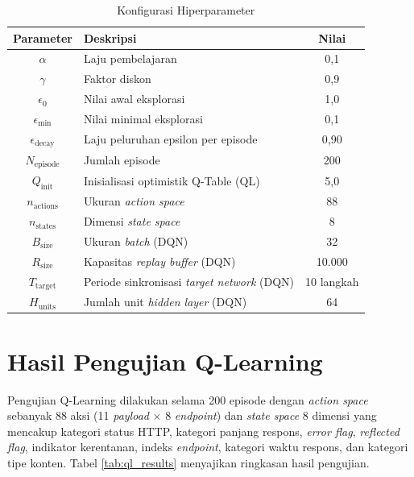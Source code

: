 \begin{table}[H]
\centering
\caption{Konfigurasi Hiperparameter}
\label{tab:hyperparams}
\begin{tabular}{|c|l|c|}
\hline
\textbf{Parameter} & \textbf{Deskripsi} & \textbf{Nilai} \\
\hline
$\alpha$ & Laju pembelajaran & 0,1 \\
$\gamma$ & Faktor diskon & 0,9 \\
$\epsilon_0$ & Nilai awal eksplorasi & 1,0 \\
$\epsilon_{\min}$ & Nilai minimal eksplorasi & 0,1 \\
$\epsilon_{\text{decay}}$ & Laju peluruhan epsilon per episode & 0,90 \\
$N_{\text{episode}}$ & Jumlah episode & 200 \\
$Q_{\text{init}}$ & Inisialisasi optimistik Q-Table (QL) & 5,0 \\
$n_{\text{actions}}$ & Ukuran \textit{action space} & 88 \\
$n_{\text{states}}$ & Dimensi \textit{state space} & 8 \\
$B_{\text{size}}$ & Ukuran \textit{batch} (DQN) & 32 \\
$R_{\text{size}}$ & Kapasitas \textit{replay buffer} (DQN) & 10.000 \\
$T_{\text{target}}$ & Periode sinkronisasi \textit{target network} (DQN) & 10 langkah \\
$H_{\text{units}}$ & Jumlah unit \textit{hidden layer} (DQN) & 64 \\
\hline
\end{tabular}
\end{table}

\section{Hasil Pengujian Q-Learning}

Pengujian Q-Learning dilakukan selama 200 episode dengan \textit{action space} sebanyak 88 aksi (11 \textit{payload} $\times$ 8 \textit{endpoint}) dan \textit{state space} 8 dimensi yang mencakup kategori status HTTP, kategori panjang respons, \textit{error flag}, \textit{reflected flag}, indikator kerentanan, indeks \textit{endpoint}, kategori waktu respons, dan kategori tipe konten. Tabel \ref{tab:ql_results} menyajikan ringkasan hasil pengujian.

